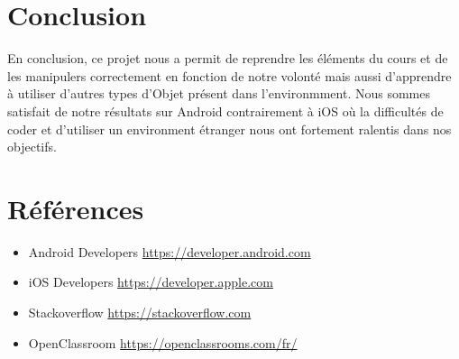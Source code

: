 \documentclass{article}
\begin{document}
\section{Conclusion}
En conclusion, ce projet nous a permit de reprendre les éléments du cours et de les manipulers correctement en fonction de notre volonté mais aussi d'apprendre à utiliser d'autres types d'Objet présent dans l'environmment. Nous sommes satisfait de notre résultats sur Android contrairement à iOS où la difficultés de coder et d'utiliser un environment étranger nous ont fortement ralentis dans nos objectifs.

\section{Références}
\begin{itemize}
    \item Android Developers \url{https://developer.android.com}
    \item iOS Developers \url{https://developer.apple.com}
    \item Stackoverflow \url{https://stackoverflow.com}
       \item OpenClassroom \url{https://openclassrooms.com/fr/}
\end{itemize}
\end{document}
